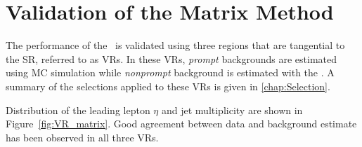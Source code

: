\begin{table}[th]
\sffamily
\centering
\caption{Summary of the selection criteria applied to the measurement regions of $r$ and $f$. ``OffZ'' means events containing two same-sign electrons with an in variant mass between 76 and 106 GeV are removed. $C_i$ denotes the electric charge of the selected lepton.}
\label{tab:MR}
\end{table}

\section{Validation of the Matrix Method}
\label{sec:MMVR}

The performance of the \mm~is validated using three regions that are tangential to the \ac{SR}, referred to as \acp{VR}. In these \acp{VR}, \emph{prompt} backgrounds are estimated using \ac{MC} simulation while \emph{nonprompt} background is estimated with the \mm. A summary of the selections applied to these VRs is given in \autoref{chap:Selection}. 

Distribution of the leading lepton $\eta$ and jet multiplicity are shown in Figure~\ref{fig:VR_matrix}. Good agreement between data and background estimate has been observed in all three \acp{VR}.

